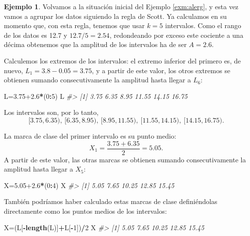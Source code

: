 \documentclass[
]{book}
\newenvironment{Shaded}{\begin{snugshade}}{\end{snugshade}}
\newcommand{\CommentTok}[1]{\textcolor[rgb]{0.56,0.35,0.01}{\textit{#1}}}
\newcommand{\DecValTok}[1]{\textcolor[rgb]{0.00,0.00,0.81}{#1}}
\newcommand{\FloatTok}[1]{\textcolor[rgb]{0.00,0.00,0.81}{#1}}
\newcommand{\KeywordTok}[1]{\textcolor[rgb]{0.13,0.29,0.53}{\textbf{#1}}}
\newcommand{\NormalTok}[1]{#1}
\newcommand{\OperatorTok}[1]{\textcolor[rgb]{0.81,0.36,0.00}{\textbf{#1}}}
\theoremstyle{definition}
\theoremstyle{definition}
\newtheorem{example}{Ejemplo}[chapter]
\theoremstyle{definition}
\theoremstyle{remark}
\begin{document}
\begin{example}
\protect\hypertarget{exm:alerg7cl}{}{\label{exm:alerg7cl} }Volvamos a la situación inicial del Ejemplo \ref{exm:alerg}, y esta vez vamos a agrupar los datos siguiendo la regla de Scott.
Ya calculamos en su momento que, con esta regla, tenemos que usar \(k=5\) intervalos. Como el rango de los datos es 12.7 y \(12.7/5=2.54\), redondeando por exceso este cociente a una décima obtenemos que la amplitud de los intervalos ha de ser \(A=2.6\).
\end{example}

Calculemos los extremos de los intervalos: el extremo inferior del primero es, de nuevo, \(L_1=3.8-0.05=3.75\), y a partir de este valor, los otros extremos se obtienen sumando consecutivamente la amplitud hasta llegar a \(L_6\):

\begin{Shaded}
\begin{Highlighting}[]
\NormalTok{L=}\FloatTok{3.75+2.6}\OperatorTok{*}\NormalTok{(}\DecValTok{0}\OperatorTok{:}\DecValTok{5}\NormalTok{)}
\NormalTok{L}
\CommentTok{\#\textgreater{} [1]  3.75  6.35  8.95 11.55 14.15 16.75}
\end{Highlighting}
\end{Shaded}

Los intervalos son, por lo tanto,
\[
[3.75, 6.35),\ [6.35,8.95),\ [8.95,11.55),\ [11.55, 14.15),\ [14.15 ,16.75).
\]

La marca de clase del primer intervalo es su punto medio:
\[
X_1=\frac{3.75+ 6.35}{2}= 5.05.
\]
A partir de este valor, las otras marcas se obtienen sumando consecutivamente la amplitud hasta llegar a \(X_5\):

\begin{Shaded}
\begin{Highlighting}[]
\NormalTok{X=}\FloatTok{5.05+2.6}\OperatorTok{*}\NormalTok{(}\DecValTok{0}\OperatorTok{:}\DecValTok{4}\NormalTok{)}
\NormalTok{X}
\CommentTok{\#\textgreater{} [1]  5.05  7.65 10.25 12.85 15.45}
\end{Highlighting}
\end{Shaded}

También podríamos haber calculado estas marcas de clase definiéndolas directamente como los puntos medios de los intervalos:

\begin{Shaded}
\begin{Highlighting}[]
\NormalTok{X=(L[}\OperatorTok{{-}}\KeywordTok{length}\NormalTok{(L)]}\OperatorTok{+}\NormalTok{L[}\OperatorTok{{-}}\DecValTok{1}\NormalTok{])}\OperatorTok{/}\DecValTok{2}
\NormalTok{X}
\CommentTok{\#\textgreater{} [1]  5.05  7.65 10.25 12.85 15.45}
\end{Highlighting}
\end{Shaded}
\end{document}
